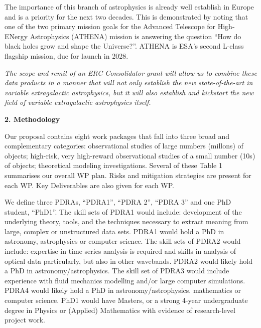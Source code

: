 \documentclass[oneside, a4paper, onecolumn, 11pt]{article}
\begin{document}
\smallskip
\smallskip
\noindent
The importance of this branch of astrophysics is already well
establish in Europe and is a priority for the next two decades. This
is demonstrated by noting that one of the two primary mission goals
for the Advanced Telescope for High-ENergy Astrophysics (ATHENA) mission 
is answering the question ``How do black holes grow and shape the
Universe?''.  ATHENA is ESA's second L-class flagship mission, due for
launch in 2028.


\smallskip
\smallskip
\noindent
{\it The scope and remit of an ERC Consolidator grant will allow us to
combine these data products in a manner that will not only establish
the new state-of-the-art in variable extragalactic astrophysics, but it 
will also establish and kickstart the new field of variable extragalactic
astrophysics itself.}




\medskip
\medskip
\noindent
\large
{\bf{\textcolor{Cerulean}{2. Methodology}}}
\normalsize

\noindent
Our proposal contains eight work packages that fall into three broad and 
complementary categories: observational studies of large numbers
(millons) of objects; high-risk, very high-reward observational
studies of a small number (10s) of objects; theoretical modeling
investigations. Several of these 
Table 1 summarises our overall WP plan. 
Risks and mitigation strategies are present for each WP. 
Key Deliverables are also given for each WP. 

\smallskip
\smallskip
\noindent
We define three PDRAs, ``PDRA1'', ``PDRA 2'', ``PDRA 3'' and one PhD student, ``PhD1''.  
The skill sets of PDRA1 would include: development of the underlying theory, tools, and 
the techniques necessary to extract meaning from large, complex or unstructured data sets. 
PDRA1 would hold a PhD in astronomy, astrophysics or computer science. 
The skill sets of PDRA2 would include: expertise in time series analysis is required and 
skills in analysis of  optical data particularly, but also in other wavebands. 
PDRA2 would likely hold a PhD in astronomy/astrophysics.
The skill set of PDRA3 would include experience with fluid mechanics modelling and/or 
large computer simulations. PDRA4 would likely hold a PhD in astronomy/astrophysics. 
mathematics or computer science. 
PhD1 would have Masters, or a strong 4-year undergraduate degree in Physics or 
(Applied) Mathematics with evidence of research-level project work.  
\end{document}
